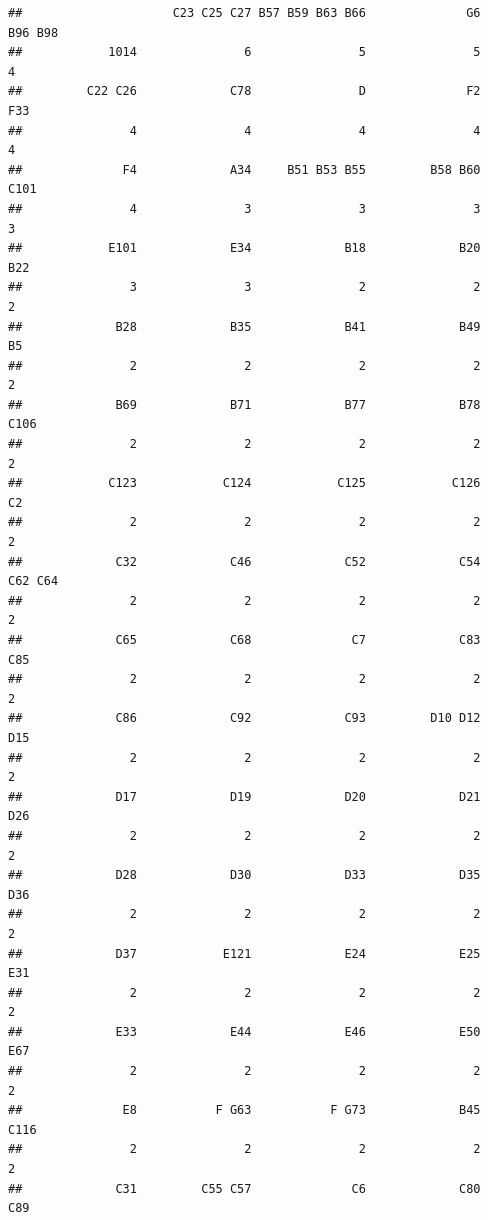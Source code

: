 \documentclass[
]{book}
\begin{document}
\begin{verbatim}
##                     C23 C25 C27 B57 B59 B63 B66              G6         B96 B98 
##            1014               6               5               5               4 
##         C22 C26             C78               D              F2             F33 
##               4               4               4               4               4 
##              F4             A34     B51 B53 B55         B58 B60            C101 
##               4               3               3               3               3 
##            E101             E34             B18             B20             B22 
##               3               3               2               2               2 
##             B28             B35             B41             B49              B5 
##               2               2               2               2               2 
##             B69             B71             B77             B78            C106 
##               2               2               2               2               2 
##            C123            C124            C125            C126              C2 
##               2               2               2               2               2 
##             C32             C46             C52             C54         C62 C64 
##               2               2               2               2               2 
##             C65             C68              C7             C83             C85 
##               2               2               2               2               2 
##             C86             C92             C93         D10 D12             D15 
##               2               2               2               2               2 
##             D17             D19             D20             D21             D26 
##               2               2               2               2               2 
##             D28             D30             D33             D35             D36 
##               2               2               2               2               2 
##             D37            E121             E24             E25             E31 
##               2               2               2               2               2 
##             E33             E44             E46             E50             E67 
##               2               2               2               2               2 
##              E8           F G63           F G73             B45            C116 
##               2               2               2               2               2 
##             C31         C55 C57              C6             C80             C89 

\end{verbatim}
\end{document}
